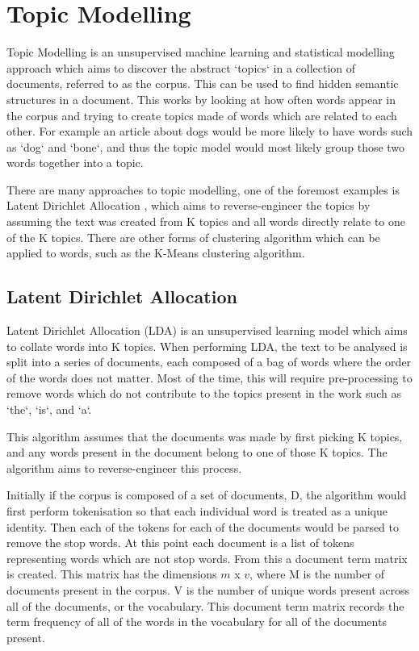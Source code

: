 \section{Topic Modelling}
\label{topic}
Topic Modelling is an unsupervised machine learning and statistical modelling approach which aims to discover the abstract `topics` in a collection of documents, referred to as the corpus. This can be used to find hidden semantic structures in a document. This works by looking at how often words appear in the corpus and trying to create topics made of words which are related to each other. For example an article about dogs would be more likely to have words such as `dog` and `bone`, and thus the topic model would most likely group those two words together into a topic. 

There are many approaches to topic modelling, one of the foremost examples is Latent Dirichlet Allocation \cite{blei2003latent}, which aims to reverse-engineer the topics by assuming the text was created from K topics and all words directly relate to one of the K topics. There are other forms of clustering algorithm which can be applied to words, such as the K-Means clustering algorithm. 

\subsection{Latent Dirichlet Allocation}
Latent Dirichlet Allocation (LDA) is an unsupervised learning model which aims to collate words into K topics. When performing LDA, the text to be analysed is split into a series of documents, each composed of a bag of words where the order of the words does not matter. Most of the time, this will require pre-processing to remove words which do not contribute to the topics present in the work such as `the`, `is`,  and `a`. 

\noindent This algorithm assumes that the documents was made by first picking K topics, and any words present in the document belong to one of those K topics. The algorithm aims to reverse-engineer this process.

Initially if the corpus is composed of a set of documents, D, the algorithm would first perform tokenisation so that each individual word is treated as a unique identity. Then each of the tokens for each of the documents would be parsed to remove the stop words. At this point each document is a list of tokens representing words which are not stop words. From this a document term matrix is created. This matrix has the dimensions $m$ x $v$, where M is the number of documents present in the corpus. V is the number of unique words present across all of the documents, or the vocabulary. This document term matrix records the term frequency of all of the words in the vocabulary for all of the documents present.

